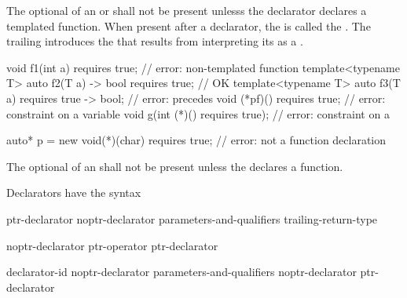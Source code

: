 \pnum
The optional  of an
 or 
shall not be present unlesss the declarator declares a
templated function.
%
%
When present after a declarator, the 
is called the .
The trailing  introduces the
 that results from interpreting
its  as a
.
%
\begin{example}
\begin{codeblock}
void f1(int a) requires true;               // error: non-templated function
template<typename T>
  auto f2(T a) -> bool requires true;       // OK
template<typename T>
  auto f3(T a) requires true -> bool;       // error:  precedes 
void (*pf)() requires true;                 // error: constraint on a variable
void g(int (*)() requires true);            // error: constraint on a 

auto* p = new void(*)(char) requires true;  // error: not a function declaration
\end{codeblock}
\end{example}

\pnum
The optional 
of an 
shall not be present unless
the  declares a function.

\pnum
Declarators have the syntax

\begin{bnf}
\br
    ptr-declarator\br
    noptr-declarator parameters-and-qualifiers trailing-return-type
\end{bnf}

\begin{bnf}
\br
    noptr-declarator\br
    ptr-operator ptr-declarator
\end{bnf}

\begin{bnf}
\br
    declarator-id \br
    noptr-declarator parameters-and-qualifiers\br
    noptr-declarator \terminal{[}  \terminal{]} \br
    \terminal{(} ptr-declarator \terminal{)}
\end{bnf}

